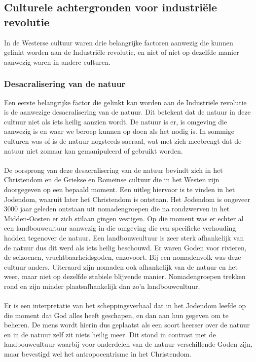 \documentclass[../summary.tex]{subfiles}
\begin{document}
	\subsection{Culturele achtergronden voor industriële revolutie}
	In de Westerse cultuur waren drie belangrijke factoren aanwezig die kunnen gelinkt worden aan de Industriële revolutie, en niet of niet op dezelfde manier aanwezig waren in andere culturen.
	\subsubsection{Desacralisering van de natuur}
	Een eerste belangrijke factor die gelinkt kan worden aan de Industriële revolutie is de aanwezige desacralisering van de natuur. Dit betekent dat de natuur in deze cultuur niet als iets heilig aanzien wordt. De natuur is er, is omgeving die aanwezig is en waar we beroep kunnen op doen als het nodig is. In sommige culturen was of is de natuur nogsteeds sacraal, wat met zich meebrengt dat de natuur niet zomaar kan gemanipuleerd of gebruikt worden. \\
	\\
	De oorsprong van deze desacralisering van de natuur bevindt zich in het Christendom en de Griekse en Romeinse cultuur die in het Westen zijn doorgegeven op een bepaald moment. Een uitleg hiervoor is te vinden in het Jodendom, waaruit later het Christendom is ontstaan. Het Jodendom is ongeveer 3000 jaar geleden ontstaan uit nomadengroepen die na rondzwerven in het Midden-Oosten er zich stilaan gingen vestigen. Op die moment was er echter al een landbouwcultuur aanwezig in die omgeving die een specifieke verhouding hadden tegenover de natuur. Een landbouwcultuur is zeer sterk afhankelijk van de natuur dus dit werd als iets heilig beschouwd. Er waren Goden voor rivieren, de seizoenen, vruchtbaarheidsgoden, enzovoort. Bij een nomadenvolk was deze cultuur anders. Uiteraard zijn nomaden ook afhankelijk van de natuur en het weer, maar niet op dezelfde stabiele blijvende manier. Nomadengroepen trekken rond en zijn minder plaatsafhankelijk dan zo'n landbouwcultuur.\\
	\\
	Er is een interpretatie van het scheppingsverhaal dat in het Jodendom leefde op die moment dat God alles heeft geschapen, en dan aan hun gegeven om te beheren. De mens wordt hierin dus geplaatst als een soort heerser over de natuur en in de natuur zelf zit niets heilig meer. Dit stond in contrast met de landbouwcultuur waarbij voor onderdelen van de natuur verschillende Goden zijn, maar bevestigd wel het antropocentrisme in het Christendom.\\
\end{document}
